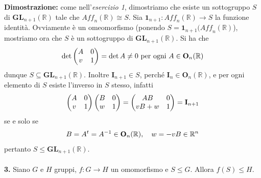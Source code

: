 \documentclass{article}
\begin{document}
\textbf{Dimostrazione:} come nell'\textit{esercizio 1}, dimostriamo che esiste un sottogruppo $S$ di $\mathbf{GL}_{n + 1}(\mathbb{R})$ tale che $\textit{Aff}_n(\mathbb{R}) \cong S$. Sia $\mathbf{1}_{n + 1} : \textit{Aff}_n(\mathbb{R}) \longrightarrow S$ la funzione identità. Ovviamente è un omeomorfismo (ponendo $S = \mathbf{1}_{n + 1}(\textit{Aff}_n(\mathbb{R})$), mostriamo ora che $S$ è un sottogruppo di $\mathbf{GL}_{n + 1}(\mathbb{R})$. Si ha che
\begin{gather}
    \det \begin{pmatrix}
        A & 0 \\
        v & 1
    \end{pmatrix} = \det A \neq 0 \text{ per ogni } A \in \mathbf{O}_n(\mathbb{R}) \notag
\end{gather}
dunque $S \subseteq \mathbf{GL}_{n + 1}(\mathbb{R})$. Inoltre $\mathbf{I}_{n + 1} \in S$, perché $\mathbf{I}_n \in \mathbf{O}_n(\mathbb{R})$, e per ogni elemento di $S$ esiste l'inverso in $S$ stesso, infatti
\begin{gather}
    \begin{pmatrix}
        A & 0 \\
        v & 1
    \end{pmatrix}
    \begin{pmatrix}
        B & 0 \\
        w & 1
    \end{pmatrix} = 
    \begin{pmatrix}
        AB & 0 \\
        vB + w & 1
    \end{pmatrix} = \mathbf{I}_{n + 1} \notag
\end{gather}
se e solo se
\begin{gather}
    B = A^t = A^{-1} \in \mathbf{O}_n(\mathbb{R}), \quad w = -vB \in \mathbb{R}^n \notag
\end{gather}
pertanto $S \leq \mathbf{GL}_{n + 1}(\mathbb{R})$. \\ \\
\textbf{3.} Siano $G$ e $H$ gruppi, $f : G \longrightarrow H$ un omomorfismo e $S \leq G$. Allora $f(S) \leq H$. \\
\end{document}
